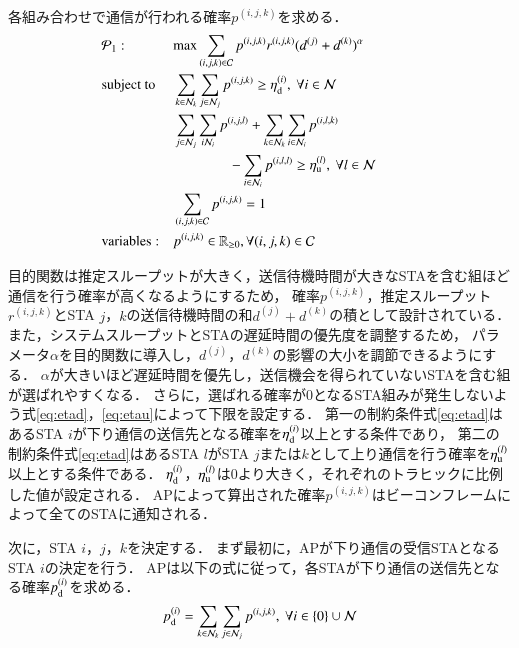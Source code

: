 \documentclass[master]{kuisthesis}		%
\newcommand{\pijk}{p^{(i,j,k)}}
\newcommand{\rijk}{r^{(i,j,k)}}
\newcommand{\mthni}{{\mathcal N}_i}
\newcommand{\mthnj}{{\mathcal N}_j}
\newcommand{\mthnk}{{\mathcal N}_k}
\begin{document}
			各組み合わせで通信が行われる確率$p^{(i,j,k)}$を求める．
			\begin{align}
				&{\mathcal P}_1: && {\rm max} \sum_{(i,j,k)\in{\mathcal C}} p^{(i,j,k)}r^{(i,j,k)}(d^{(j)}+d^{(k)})^{\alpha} &&&&&&\\
				&{\rm subject\ to} && \sum_{k\in\mthnk} \sum_{j\in\mthnj} p^{(i,j,k)} \geq \eta_{\rm d}^{(i)},\ \forall i\in {\mathcal N} \label{eq:etad} \\
				&&& \sum_{j\in\mthnj} \sum_{i\mthni} p^{(i,j,l)}+\sum_{k\in\mthnk} \sum_{i\in\mthni} p^{(i,l,k)} \nonumber\\
				&&&\qquad\qquad- \sum_{i\in\mthni} p^{(i,l,l)} \geq \eta_{\rm u}^{(l)},\ \forall l\in {\mathcal N} \label{eq:etau} \\
				&&& \sum_{(i,j,k)\in{\mathcal C}} p^{(i,j,k)}=1 \\
				&{\rm variables:} &&p^{(i,j,k)} \in {\mathbb R}_{\geq 0},\forall(i,j,k)\in {\mathcal C}
			\end{align}
			\par
			目的関数は推定スループットが大きく，送信待機時間が大きなSTAを含む組ほど通信を行う確率が高くなるようにするため，
			確率$\pijk$，推定スループット$\rijk$とSTA $j$，$k$の送信待機時間の和$d^{(j)}+d^{(k)}$の積として設計されている．
			また，システムスループットとSTAの遅延時間の優先度を調整するため，
			パラメータ$\alpha$を目的関数に導入し，$d^{(j)}$，$d^{(k)}$の影響の大小を調節できるようにする．
			$\alpha$が大きいほど遅延時間を優先し，送信機会を得られていないSTAを含む組が選ばれやすくなる．
			さらに，選ばれる確率が0となるSTA組みが発生しないよう式\eqref{eq:etad}，\eqref{eq:etau}によって下限を設定する．
			第一の制約条件式\eqref{eq:etad}はあるSTA $i$が下り通信の送信先となる確率を$\eta_{\rm d}^{(i)}$以上とする条件であり，
			第二の制約条件式\eqref{eq:etad}はあるSTA $l$がSTA $j$または$k$として上り通信を行う確率を$\eta_{\rm u}^{(l)}$以上とする条件である．
			$\eta_{\rm d}^{(i)}$，$\eta_{\rm u}^{(l)}$は0より大きく，それぞれのトラヒックに比例した値が設定される．
			APによって算出された確率$\pijk$はビーコンフレームによって全てのSTAに通知される．
			\par
			次に，STA $i$，$j$，$k$を決定する．
			まず最初に，APが下り通信の受信STAとなるSTA $i$の決定を行う．
			APは以下の式に従って，各STAが下り通信の送信先となる確率$p_{\rm d}^{(i)}$を求める．
			\begin{equation}
				p_{\rm d}^{(i)}= \sum_{k\in\mthnk}\sum_{j\in\mthnj}p^{(i,j,k)}, \ \forall i \in \{0\}\cup{\mathcal N}
			\end{equation}
\end{document}
